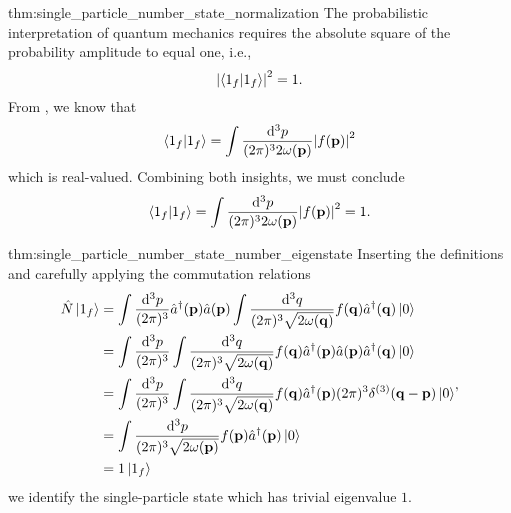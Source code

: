 \begin{delayedproof}{thm:single_particle_number_state_normalization}
	The probabilistic interpretation of quantum mechanics requires the absolute square of the probability amplitude to equal one, i.e.,
	\begin{equation*}
		\abs{\braket{1_f}}^2
		=
		1
		.
	\end{equation*}
	From , we know that
	\begin{equation*}
		\braket{1_f}
		=
		\int\frac{\dd[3]{p}}{(2\pi)^32\omega(\vb{p})}
		\abs{f(\vb{p})}^2
	\end{equation*}
	which is real-valued. Combining both insights, we must conclude
	\begin{equation*}
		\braket{1_f}
		=
		\int\frac{\dd[3]{p}}{(2\pi)^32\omega(\vb{p})}
		\abs{f(\vb{p})}^2
		=
		1
		.
	\end{equation*}
\end{delayedproof}
\begin{delayedproof}{thm:single_particle_number_state_number_eigenstate}
	Inserting the definitions and carefully applying the commutation relations
	\begin{equation*}
		\begin{split}
			\hat{N}
			\ket{1_f}
			&=
			\int\frac{\dd[3]{p}}{(2\pi)^3}
			\hat{a}^\dagger(\vb{p})
			\hat{a}(\vb{p})
			\int\frac{\dd[3]{q}}{(2\pi)^3\sqrt{2\omega(\vb{q})}}
			f(\vb{q})
			\hat{a}^\dagger(\vb{q})
			\ket{0}
			\\
			&=
			\int\frac{\dd[3]{p}}{(2\pi)^3}
			\int\frac{\dd[3]{q}}{(2\pi)^3\sqrt{2\omega(\vb{q})}}
			f(\vb{q})
			\hat{a}^\dagger(\vb{p})
			\hat{a}(\vb{p})
			\hat{a}^\dagger(\vb{q})
			\ket{0}
			\\
			&=
			\int\frac{\dd[3]{p}}{(2\pi)^3}
			\int\frac{\dd[3]{q}}{(2\pi)^3\sqrt{2\omega(\vb{q})}}
			f(\vb{q})
			\hat{a}^\dagger(\vb{p})
			(2\pi)^3
			\delta^{(3)}(\vb{q}-\vb{p})
			\ket{0}
			\\
			&=
			\int\frac{\dd[3]{p}}{(2\pi)^3\sqrt{2\omega(\vb{p})}}
			f(\vb{p})
			\hat{a}^\dagger(\vb{p})
			\ket{0}
			\\
			&=
			1
			\ket{1_f}
		\end{split}
		,
	\end{equation*}
	we identify the single-particle state which has trivial eigenvalue $1$.
\end{delayedproof}

